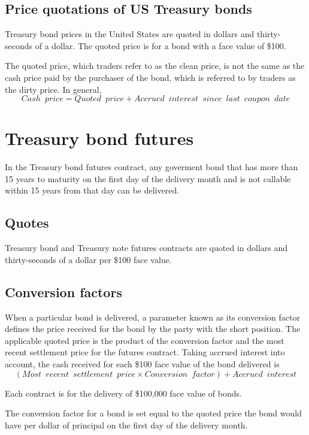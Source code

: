 \documentclass{article}
\begin{document}
\subsection{Price quotations of US Treasury bonds}
Treasury bond prices in the United States are quoted in dollars and thirty-seconds of a dollar. The quoted price is for a bond with a face value of \$100.

The quoted price, which traders refer to as the clean price, is not the same as the cash price paid by the purchaser of the bond, which is referred to by traders as the dirty price. In general,
\[
Cash\enspace price=Quoted\enspace price+Accrued\enspace interest\enspace since\enspace last\enspace coupon\enspace date
\]

\section{Treasury bond futures}
In the Treasury bond futures contract, any goverment bond that has more than 15 years to maturity on the first day of the delivery month and is not callable within 15 years from that day can be delivered.

\subsection{Quotes}
Treasury bond and Treasury note futures contracts are quoted in dollars and thirty-seconds of a dollar per \$100 face value.

\subsection{Conversion factors}
When a particular bond is delivered, a parameter known as its conversion factor defines the price received for the bond by the party with the short position. The applicable quoted price is the product of the conversion factor and the most recent settlement price for the futures contract. Taking accrued interest into account, the cash received for each \$100 face value of the bond  delivered is
\[
(Most\enspace recent\enspace settlement\enspace price\times Conversion\enspace factor)+Accrued\enspace interest
\]

Each contract is for the delivery of \$100,000 face value of bonds.

The conversion factor for a bond is set equal to the quoted price the bond would have per dollar of principal on the first day of the delivery month.
\end{document}
